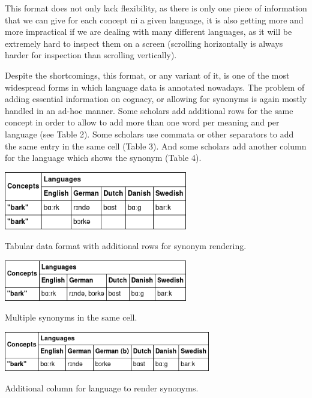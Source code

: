 \documentclass[a4paper,svgnames]{scrartcl}
\begin{document}
This format does not only lack flexibility, as there is only one piece
of information that we can give for each concept ni a given language, it
is also getting more and more impractical if we are dealing with many
different languages, as it will be extremely hard to inspect them on a
screen (scrolling horizontally is always harder for inspection than
scrolling vertically).

Despite the shortcomings, this format, or any variant of it, is one of
the most widespread forms in which language data is annotated nowadays.
The problem of adding essential information on cognacy, or allowing for
synonyms is again mostly handled in an ad-hoc manner. Some scholars add
additional rows for the same concept in order to allow to add more than
one word per meaning and per language (see Table 2).
Some scholars use commata or other separators to add the same entry in
the same cell (Table 3).
And some scholars add another column for the language which shows the
synonym (Table 4).

\begin{table}
\centering
\includegraphics[width=8cm]{images/table-2.png}
\caption{Tabular data format with additional rows for synonym
rendering.}
\end{table}


\begin{table}
\centering
\includegraphics[width=8cm]{images/table-3.png}
\caption{Multiple synonyms in the same cell.}
\end{table}



\begin{table}
\centering
\includegraphics[width=9cm]{images/table-4.png}
\caption{Additional column for language to render synonyms.}
\end{table}
\end{document}
